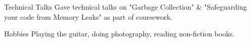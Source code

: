 


\begin{cvskills}


  \cvskill
  {Technical Talks}
  {Gave technical talks on "Garbage Collection" \& "Safeguarding your code from Memory Leaks" as part of coursework.}


  \cvskill
  {Hobbies}
  {Playing the guitar, doing photography, reading non-fiction books.}


\end{cvskills}